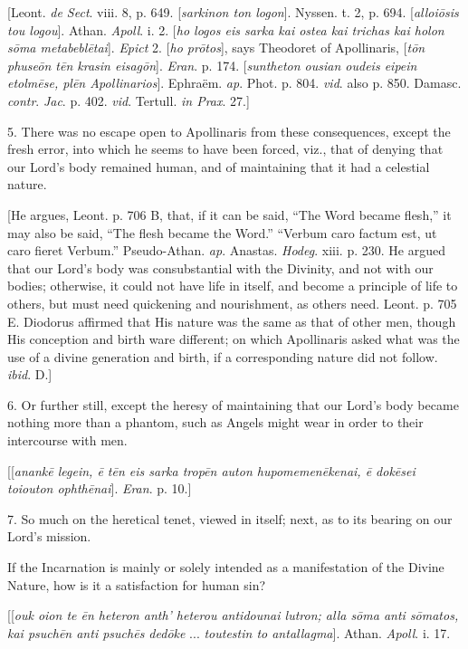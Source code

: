 [Leont. \emph{de Sect}. viii. 8, p. 649. [\emph{sarkinon ton logon}].
Nyssen. t. 2, p. 694. [\emph{alloi\={o}sis tou logou}]. Athan. \emph{Apoll}.
i. 2. [\emph{ho logos eis sarka kai ostea kai trichas kai holon s\={o}ma
metabebl\={e}tai}]. \emph{Epict} 2. [\emph{ho pr\={o}tos}],
says Theodoret of Apollinaris, [\emph{t\={o}n phuse\={o}n t\={e}n
krasin eisag\={o}n}]. \emph{Eran}. p. 174. [\emph{suntheton ousian
oudeis eipein etolm\={e}se, pl\={e}n Apollinarios}]. Ephraëm.
\emph{ap}. Phot. p. 804. \emph{vid}. also p. 850. Damasc. \emph{contr}.
\emph{Jac}. p. 402. \emph{vid}. Tertull. \emph{in Prax}. 27.]

5. There was no escape open to Apollinaris from these consequences,
except the fresh error, into which he seems to have been forced, viz.,
that of denying that our Lord's body remained human, and of
maintaining that it had a celestial nature.

[He argues, Leont. p. 706 B, that, if it can be said, ``The
Word became flesh,'' it may also be said, ``The flesh became
the Word.'' ``Verbum caro factum est, ut caro fieret Verbum.''
Pseudo-Athan. \emph{ap}. Anastas. \emph{Hodeg}. xiii. p. 230. He
argued that our Lord's body was consubstantial with the Divinity, and
not with our bodies; otherwise, it could not have life in itself, and
become a principle of life to others, but must need quickening and
nourishment, as others need. Leont. p. 705 E. Diodorus affirmed that
His nature was the same as that of other men, though His conception
and birth ware different; on which Apollinaris asked what was the use
of a divine generation and birth, if a corresponding nature did not
follow. \emph{ibid}. D.]

6. Or further still, except the heresy of maintaining that our Lord's
body became nothing more than a phantom, such as Angels might wear in
order to their intercourse with men.

[[\emph{anank\={e} legein, \={e} t\={e}n eis sarka trop\={e}n
auton hupomemen\={e}kenai, \={e} dok\={e}sei toiouton ophth\={e}nai}].
\emph{Eran}. p. 10.]

7. So much on the heretical tenet, viewed in itself; next, as to
its bearing on our Lord's mission.

If the Incarnation is mainly or solely intended as a manifestation
of the Divine Nature, how is it a satisfaction for human sin?

[[\emph{ouk oion te \={e}n heteron anth' heterou antidounai lutron;
alla s\={o}ma anti s\={o}matos, kai psuch\={e}n anti psuch\={e}s
ded\={o}ke} ... \emph{toutestin to antallagma}]. Athan. \emph{Apoll}.
i. 17.


